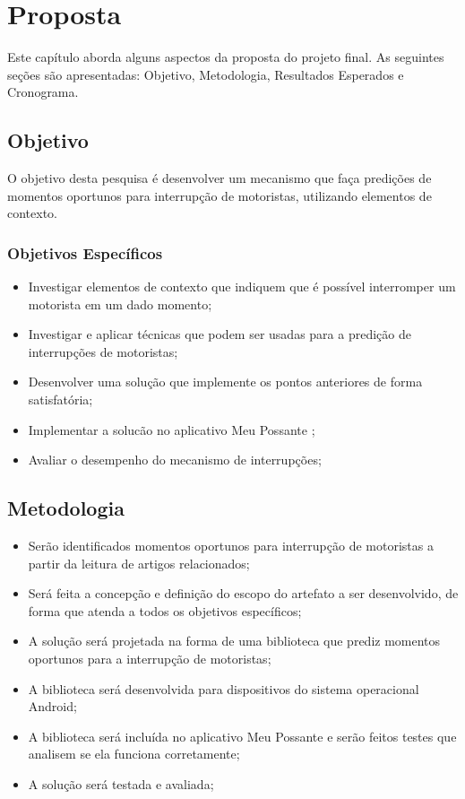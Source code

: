 \chapter{Proposta}
\label{proposta}
Este capítulo aborda alguns aspectos da proposta do projeto final. As seguintes seções são apresentadas:
Objetivo, Metodologia, Resultados Esperados e Cronograma.

\section{Objetivo}
\label{objetivo}
O objetivo desta pesquisa é desenvolver um mecanismo que faça predições de momentos oportunos para interrupção de
motoristas, utilizando elementos de contexto.

\subsection{Objetivos Específicos}
\label{objetivos-esp}
\begin{itemize}
  \item Investigar elementos de contexto que indiquem que é possível interromper um motorista em um dado momento;
  \item Investigar e aplicar técnicas que podem ser usadas para a predição de interrupções de motoristas;
  \item Desenvolver uma solução que implemente os pontos anteriores de forma satisfatória;
  \item Implementar a solucão no aplicativo Meu Possante \cite{meupossante};
  \item Avaliar o desempenho do mecanismo de interrupções;
\end{itemize}

\section{Metodologia}
\label{metodologia}
\begin{itemize}
  \item Serão identificados momentos oportunos para interrupção de motoristas a partir da leitura de artigos
    relacionados;
  \item Será feita a concepção e definição do escopo do artefato a ser desenvolvido, de forma que atenda a
    todos os objetivos específicos;
  \item A solução será projetada na forma de uma biblioteca que prediz momentos oportunos para a interrupção
    de motoristas;
  \item A biblioteca será desenvolvida para dispositivos do sistema operacional Android;
  \item A biblioteca será incluída no aplicativo Meu Possante \cite{meupossante} e serão feitos testes que analisem se ela funciona
    corretamente;
  \item A solução será testada e avaliada;
\end{itemize}

